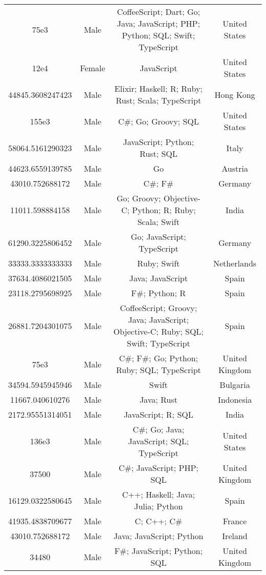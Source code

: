 \begin{center}
\begin{tabular}{ |c|c|c|c| }
75e3  &  Male  &  CoffeeScript; Dart; Go; Java; JavaScript; PHP; Python; SQL; Swift; TypeScript  &  United States  \\ 
12e4  &  Female  &  JavaScript  &  United States  \\ 
44845.3608247423  &  Male  &  Elixir; Haskell; R; Ruby; Rust; Scala; TypeScript  &  Hong Kong  \\ 
155e3  &  Male  &  C\#; Go; Groovy; SQL  &  United States  \\ 
58064.5161290323  &  Male  &  JavaScript; Python; Rust; SQL  &  Italy  \\ 
44623.6559139785  &  Male  &  Go  &  Austria  \\ 
43010.752688172  &  Male  &  C\#; F\#  &  Germany  \\ 
11011.598884158  &  Male  &  Go; Groovy; Objective-C; Python; R; Ruby; Scala; Swift  &  India  \\ 
61290.3225806452  &  Male  &  Go; JavaScript; TypeScript  &  Germany  \\ 
33333.3333333333  &  Male  &  Ruby; Swift  &  Netherlands  \\ 
37634.4086021505  &  Male  &  Java; JavaScript  &  Spain  \\ 
23118.2795698925  &  Male  &  F\#; Python; R  &  Spain  \\ 
26881.7204301075  &  Male  &  CoffeeScript; Groovy; Java; JavaScript; Objective-C; Ruby; SQL; Swift; TypeScript  &  Spain  \\ 
75e3  &  Male  &  C\#; F\#; Go; Python; Ruby; SQL; TypeScript  &  United Kingdom  \\ 
34594.5945945946  &  Male  &  Swift  &  Bulgaria  \\ 
11667.040610276  &  Male  &  Java; Rust  &  Indonesia  \\ 
2172.95551314051  &  Male  &  JavaScript; R; SQL  &  India  \\ 
136e3  &  Male  &  C\#; Go; Java; JavaScript; SQL; TypeScript  &  United States  \\ 
37500  &  Male  &  C\#; JavaScript; PHP; SQL  &  United Kingdom  \\ 
16129.0322580645  &  Male  &  C++; Haskell; Java; Julia; Python  &  Spain  \\ 
41935.4838709677  &  Male  &  C; C++; C\#  &  France  \\ 
43010.752688172  &  Male  &  Java; JavaScript; Python  &  Ireland  \\ 
34480  &  Male  &  F\#; JavaScript; Python; SQL  &  United Kingdom  \\ 

\end{tabular}
\end{center}

